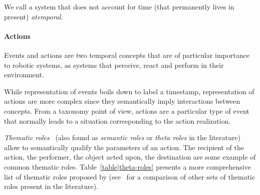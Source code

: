 We call a system that does not account for time (\ie that permanently lives in
present) \emph{atemporal}.


\paragraph{Actions}

Events and actions are two temporal concepts that are of particular importance to
robotic systems, as systems that perceive, react and perform in their environment.

While representation of events boils down to label a timestamp,
representation of actions are more complex since they semantically imply
interactions between concepts. From a taxonomy point of view, actions are a
particular type of event that normally leads to a situation corresponding to the
action realization.


\emph{Thematic roles}~\cite{Gruber1965} (also found as \emph{semantic roles} or
\emph{theta roles} in the literature) allow to semantically qualify the
parameters of an action. The recipient of the action, the performer, the object
acted upon, the destination are some example of common thematic roles.
Table~\ref{table|theta-roles} presents a more comprehensive list of thematic
roles proposed by \cite{Aarts1997} (see~\cite{Gutierrez2001} for a comparison
of other sets of thematic roles present in the literature).

